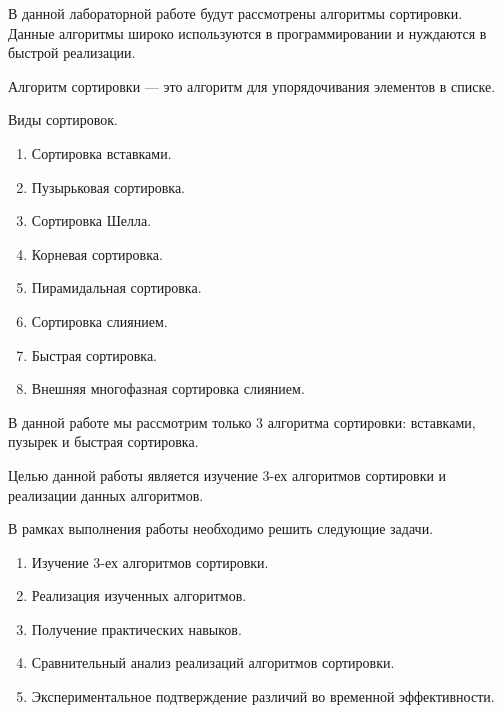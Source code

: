 \Introduction
В данной лабораторной работе будут рассмотрены алгоритмы сортировки. 
Данные алгоритмы широко используются в программировании и нуждаются в быстрой реализации.

Алгоритм сортировки — это алгоритм для упорядочивания элементов в списке.

Виды сортировок.
\begin{enumerate}
	\item Сортировка вставками.
	\item Пузырьковая сортировка.
	\item Сортировка Шелла.
	\item Корневая сортировка.
	\item Пирамидальная сортировка.
	\item Сортировка слиянием.
	\item Быстрая сортировка.
	\item Внешняя многофазная сортировка слиянием.
\end{enumerate}

В данной работе мы рассмотрим только 3 алгоритма сортировки: вставками, пузырек и быстрая сортировка.

Целью данной работы является изучение 3-ех алгоритмов сортировки и реализации данных алгоритмов.

В рамках выполнения работы необходимо решить следующие задачи.

\begin{enumerate}
	\item Изучение 3-ех алгоритмов сортировки.
	\item Реализация изученных алгоритмов.
	\item Получение практических навыков.
	\item Сравнительный анализ реализаций алгоритмов сортировки.
	\item Экспериментальное подтверждение различий во временной эффективности.
\end{enumerate}